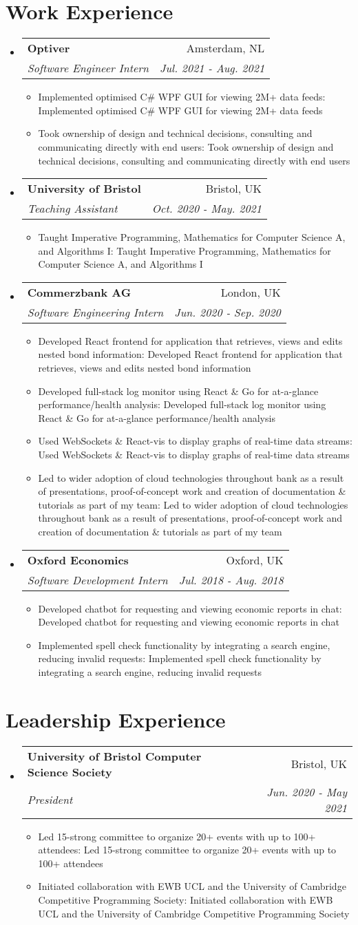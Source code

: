 \documentclass[a4paper,11pt]{article}
\makeatletter
\def \ifempty#1{\def\temp{#1} \ifx\temp\empty }
\newcommand{\resumeItem}[2]{
  \item\small{
  	\ifempty{#1}#2\else\textbf{#1}{: #2 \vspace{-2pt}}\fi
  }
}
\newcommand{\resumeSubheading}[4]{
  \vspace{-1pt}\item
    \begin{tabular*}{0.97\textwidth}{l@{\extracolsep{\fill}}r}
      \textbf{#1} & #2 \\
      \textit{\small#3} & \textit{\small #4} \\
    \end{tabular*}\vspace{-5pt}
}
\newcommand{\resumeSubHeadingListStart}{\begin{itemize}[leftmargin=*]}
\newcommand{\resumeSubHeadingListEnd}{\end{itemize}}
\newcommand{\resumeItemListStart}{\begin{itemize}}
\newcommand{\resumeItemListEnd}{\end{itemize}\vspace{-5pt}}
\makeatother
\begin{document}
\section{Work Experience}
  \resumeSubHeadingListStart
    \resumeSubheading
      {Optiver}{Amsterdam, NL}
      {Software Engineer Intern}{Jul. 2021 - Aug. 2021}
      \resumeItemListStart
      	\resumeItem{}
          {Implemented optimised C\# WPF GUI for viewing 2M+ data feeds}
      	\resumeItem{}
          {Took ownership of design and technical decisions, consulting and communicating directly with end users}
      \resumeItemListEnd
    \resumeSubheading
      {University of Bristol}{Bristol, UK}
      {Teaching Assistant}{Oct. 2020 - May. 2021}
      \resumeItemListStart
      	\resumeItem{}
          {Taught Imperative Programming, Mathematics for Computer Science A, and Algorithms I}
      \resumeItemListEnd
    \resumeSubheading
      {Commerzbank AG}{London, UK}
      {Software Engineering Intern}{Jun. 2020 - Sep. 2020}
      \resumeItemListStart
      	\resumeItem{}
          {Developed React frontend for application that retrieves, views and edits nested bond information}
        \resumeItem{}
          {Developed full-stack log monitor using React \& Go for at-a-glance performance/health analysis}
        \resumeItem{}
          {Used WebSockets \& React-vis to display graphs of real-time data streams}
        \resumeItem{}
          {Led to wider adoption of cloud technologies throughout bank as a result of presentations, proof-of-concept work and creation of documentation \& tutorials as part of my team}
      \resumeItemListEnd
    \resumeSubheading
      {Oxford Economics}{Oxford, UK}
      {Software Development Intern}{Jul. 2018 - Aug. 2018}
      \resumeItemListStart
      	\resumeItem{}
          {Developed chatbot for requesting and viewing economic reports in chat}
        \resumeItem{}  
          {Implemented spell check functionality by integrating a search 
          engine, reducing invalid requests}
      \resumeItemListEnd
  \resumeSubHeadingListEnd


\section{Leadership Experience}
  \resumeSubHeadingListStart
    \resumeSubheading
      {University of Bristol Computer Science Society}{Bristol, UK}
      {President}{Jun. 2020 - May 2021}
      \resumeItemListStart
        \resumeItem{}
          {Led 15-strong committee to organize 20+ events with up to 100+ attendees}
        \resumeItem{}
          {Initiated collaboration with EWB UCL and the University of Cambridge Competitive Programming Society}
      \resumeItemListEnd
  \resumeSubHeadingListEnd
\end{document}
